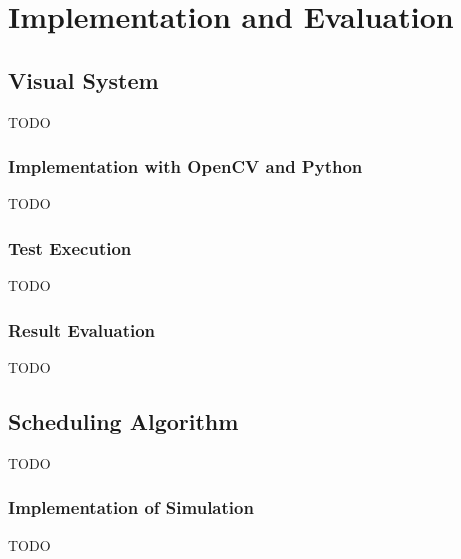 \chapter{Implementation and Evaluation}
\label{chap:impl}


\section{Visual System}
TODO
\subsection{Implementation with OpenCV and Python}
TODO
\subsection{Test Execution}
TODO
\subsection{Result Evaluation}
TODO

\section{Scheduling Algorithm}
TODO
\subsection{Implementation of Simulation}
TODO
